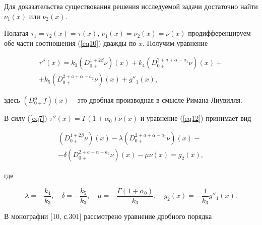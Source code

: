 Для доказательства существования решения исследуемой задачи достаточно найти $\nu_{1}(x)$ или $\nu_{2}(x)$.



Полагая $\tau_{1}=\tau_{2}(x)=\tau(x)$, $\nu_{1}(x)=\nu_{2}(x)=\nu(x)$ продифференцируем обе части соотношения (\ref{eq10}) дважды по $x$. Получим уравнение

\begin{equation}

       \label{eq12} {\begin{array}{l}

\displaystyle \tau''(x)=k_{3} \left( D_{0+}^{1+2 \beta} \nu \right) (x) + k_{4} \left( D_{0+}^{2+a+\alpha-a_{1}} \nu \right) (x)+\\

\displaystyle  + k_{5}\left( D_{0+}^{2+a+\alpha-a_{2}} \nu \right) (x)+ g''_{1}(x),

\end{array}}

\end{equation}

здесь $(D_{0+}^{\alpha}f)(x)$ -- это дробная производная в смысле Римана-Лиувилля.



В силу (\ref{eq7}) $\tau''(x)=\Gamma(1+\alpha_{0})\nu(x)$ и уравнение (\ref{eq12}) принимает вид

\begin{equation}

       \label{eq13} {\begin{array}{l}

\displaystyle  \left( D_{0+}^{1+2 \beta} \nu \right) (x) -\lambda \left( D_{0+}^{2+a+\alpha-a_{1}} \nu \right) (x)-\\

\displaystyle  -\delta \left( D_{0+}^{2+a+\alpha-a_{2}} \nu \right) (x)-\mu \nu(x)= g_{2}(x),

\end{array}}

\end{equation}

где

\[

\lambda=-\frac{k_{4}}{k_{3}}, \quad \delta=-\frac{k_{5}}{k_{3}}, \quad \mu=-\frac{\Gamma(1+\alpha_{0})}{k_{3}}, \quad g_{2}(x)=-\frac{1}{k_{3}} g''_{1}(x).

\]



В монографии [10, с.301] рассмотрено уравнение дробного порядка

